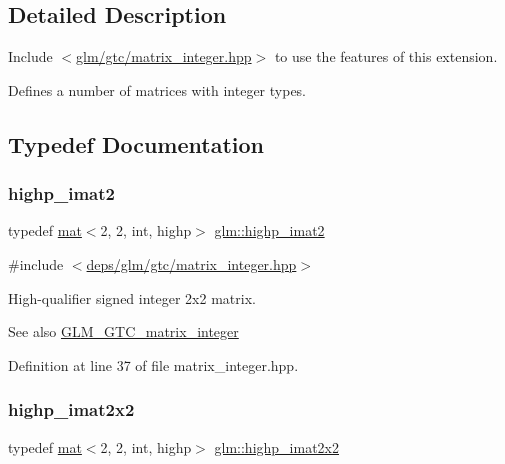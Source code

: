 \subsection{Detailed Description}
Include $<$\hyperlink{matrix__integer_8hpp}{glm/gtc/matrix\+\_\+integer.\+hpp}$>$ to use the features of this extension.

Defines a number of matrices with integer types. 

\subsection{Typedef Documentation}
\mbox{\label{group__gtc__matrix__integer_ga5b3d41917c60488d2babd72ca26d01ba}} 
\subsubsection{\texorpdfstring{highp\+\_\+imat2}{highp\_imat2}}
{\footnotesize\ttfamily typedef \hyperlink{structglm_1_1mat}{mat}$<$2, 2, int, highp$>$ \hyperlink{group__gtc__matrix__integer_ga5b3d41917c60488d2babd72ca26d01ba}{glm\+::highp\+\_\+imat2}}



{\ttfamily \#include $<$\hyperlink{matrix__integer_8hpp}{deps/glm/gtc/matrix\+\_\+integer.\+hpp}$>$}

High-\/qualifier signed integer 2x2 matrix. \begin{DoxySeeAlso}{See also}
\hyperlink{group__gtc__matrix__integer}{G\+L\+M\+\_\+\+G\+T\+C\+\_\+matrix\+\_\+integer} 
\end{DoxySeeAlso}


Definition at line 37 of file matrix\+\_\+integer.\+hpp.

\mbox{\label{group__gtc__matrix__integer_ga9d5c6c5a4640f7c794a77e3f60b91670}} 
\subsubsection{\texorpdfstring{highp\+\_\+imat2x2}{highp\_imat2x2}}
{\footnotesize\ttfamily typedef \hyperlink{structglm_1_1mat}{mat}$<$2, 2, int, highp$>$ \hyperlink{group__gtc__matrix__integer_ga9d5c6c5a4640f7c794a77e3f60b91670}{glm\+::highp\+\_\+imat2x2}}



